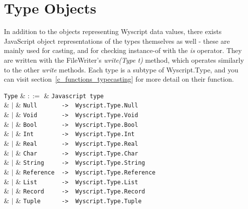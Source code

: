 
\section{Type Objects}
\label{c_types_type_objects}

In addition to the objects representing Wyscript data values, there exists JavaScript object representations of the types themselves as well - these are mainly used for casting, and for checking instance-of with the {\em is} operator. They are written with the FileWriter's {\em write(Type t)} method, which operates similarly to the other {\em write} methods. Each type is a subtype of Wyscript.Type, and you can visit section~\ref{c_functions_typecasting} for more detail on their function.


\begin{syntax}
  \verb+Type+ & $::=$ & \verb+Javascript type+\\
  & $|$ & \verb+Null       ->  Wyscript.Type.Null+\\
  & $|$ & \verb+Void       ->  Wyscript.Type.Void+\\
  & $|$ & \verb+Bool       ->  Wyscript.Type.Bool+\\
  & $|$ & \verb+Int        ->  Wyscript.Type.Int+\\
  & $|$ & \verb+Real       ->  Wyscript.Type.Real+\\
  & $|$ & \verb+Char       ->  Wyscript.Type.Char+\\
  & $|$ & \verb+String     ->  Wyscript.Type.String+\\
  & $|$ & \verb+Reference  ->  Wyscript.Type.Reference+\\
  & $|$ & \verb+List       ->  Wyscript.Type.List+\\
  & $|$ & \verb+Record     ->  Wyscript.Type.Record+\\
  & $|$ & \verb+Tuple      ->  Wyscript.Type.Tuple+\\
\end{syntax}
